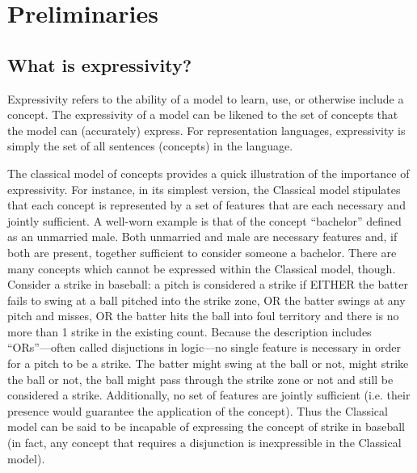 \documentclass[doc,floatsintext]{apa6}
\begin{document}

\section{Preliminaries} \label{sec:pre}

\subsection{What is expressivity?}

Expressivity refers to the ability of a model to learn, use, or otherwise include a concept.
The expressivity of a model can be likened to the set of concepts that the model can (accurately) express.
For representation languages, expressivity is simply the set of all sentences (concepts) in the language.

The classical model of concepts provides a quick illustration of the importance of expressivity.
For instance, in its simplest version, the Classical model stipulates that each concept is represented by a set of features that are each necessary and jointly sufficient.
A well-worn example is that of the concept ``bachelor'' defined as an unmarried male.
Both unmarried and male are necessary features and, if both are present, together sufficient to consider someone a bachelor.
There are many concepts which cannot be expressed within the Classical model, though.
Consider a strike in baseball: a pitch is considered a strike if EITHER the batter fails to swing at a ball pitched into the strike zone, OR the batter swings at any pitch and misses, OR the batter hits the ball into foul territory and there is no more than 1 strike in the existing count.
Because the description includes ``ORs''---often called disjuctions in logic---no single feature is necessary in order for a pitch to be a strike. The batter might swing at the ball or not, might strike the ball or not, the ball might pass through the strike zone or not and still be considered a strike.
Additionally, no set of features are jointly sufficient (i.e. their presence would guarantee the application of the concept).
Thus the Classical model can be said to be incapable of expressing the concept of strike in baseball (in fact, any concept that requires a disjunction is inexpressible in the Classical model).
\end{document}
